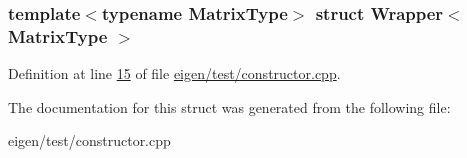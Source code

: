 \subsubsection*{template$<$typename Matrix\+Type$>$\newline
struct Wrapper$<$ Matrix\+Type $>$}



Definition at line \hyperlink{eigen_2test_2constructor_8cpp_source_l00015}{15} of file \hyperlink{eigen_2test_2constructor_8cpp_source}{eigen/test/constructor.\+cpp}.



The documentation for this struct was generated from the following file\+:\begin{DoxyCompactItemize}
\item 
eigen/test/constructor.\+cpp\end{DoxyCompactItemize}
